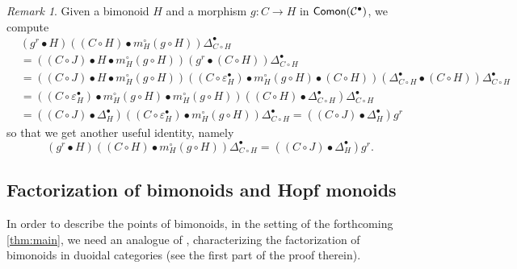 \documentclass[nosumlimits,twoside]{amsart}
\theoremstyle{definition}
\theoremstyle{remark}
\newtheorem{remark}[remark]{\sc Remark}
\newcommand{\rd}[1]{{\color{red}{#1}}}
\newcommand{\Cc}{\mathcal{C}}
\def\Comon{{\sf Comon}}
\begin{document}
\begin{remark}%
Given a bimonoid $H$ and a morphism $g:C\rightarrow H$  in $\Comon(\Cc^\bullet)$, we compute%
\begin{align*}
&\left( g^{r}\bullet H\right) \left( \left( C\circ H\right) \bullet
m_{H}^{\circ }\left( g\circ H\right) \right) \Delta _{C\circ H}^{\bullet } \\
&=\left( \left( C\circ J\right) \bullet H\bullet m_{H}^{\circ }\left(
g\circ H\right) \right) \left( g^{r}\bullet \left( C\circ H\right) \right)
\Delta _{C\circ H}^{\bullet } \\
&=\left( \left( C\circ J\right) \bullet H\bullet m_{H}^{\circ }\left(
g\circ H\right) \right) \left( \left( C\circ \varepsilon _{H}^{\bullet
}\right) \bullet m_{H}^{\circ }\left( g\circ H\right) \bullet \left( C\circ
H\right) \right) \left( \Delta _{C\circ H}^{\bullet }\bullet \left( C\circ
H\right) \right) \Delta _{C\circ H}^{\bullet } \\
&=\left( \left( C\circ \varepsilon _{H}^{\bullet }\right) \bullet
m_{H}^{\circ }\left( g\circ H\right) \bullet m_{H}^{\circ }\left( g\circ
H\right) \right) \left( \left( C\circ H\right) \bullet \Delta _{C\circ
H}^{\bullet }\right) \Delta _{C\circ H}^{\bullet } \\
&=\left( \left( C\circ J\right) \bullet \Delta _{H}^{\bullet }\right)
\left( \left( C\circ \varepsilon _{H}^{\bullet }\right) \bullet m_{H}^{\circ
}\left( g\circ H\right) \right) \Delta _{C\circ H}^{\bullet } 
=\left( \left( C\circ J\right) \bullet \Delta _{H}^{\bullet }\right) g^{r}
\end{align*}%
so that we get another useful identity, namely
\begin{equation}
\left( g^{r}\bullet H\right) \left( \left( C\circ H\right) \bullet
m_{H}^{\circ }\left( g\circ H\right) \right) \Delta _{C\circ H}^{\bullet
}=\left( \left( C\circ J\right) \bullet \Delta _{H}^{\bullet }\right) g^{r}.
\label{form:Deltagl}
\end{equation}%
\end{remark}

\subsection{Factorization of bimonoids and Hopf monoids}

In order to describe the points of bimonoids, in the setting of the forthcoming \cref{thm:main}, we need an analogue of \cite[Theorem 7.2.3]{Majid-book}, characterizing the factorization of bimonoids in duoidal categories (see the first part of the proof therein).
\end{document}
